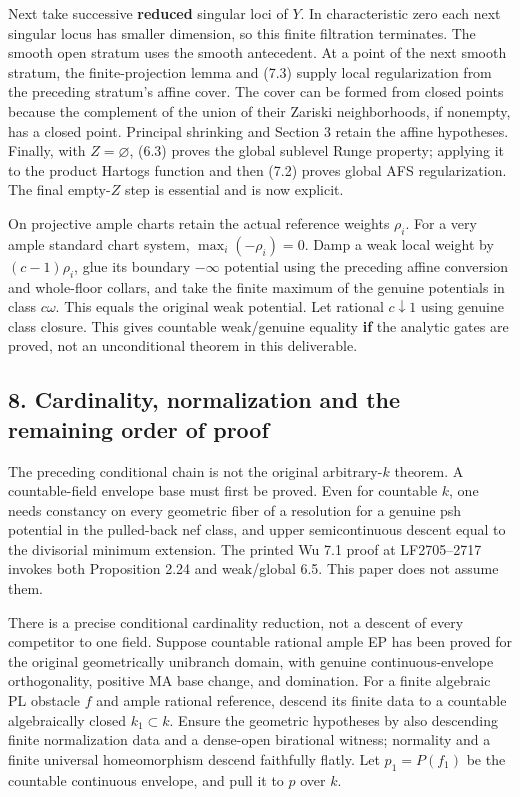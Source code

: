 \documentclass[
  10pt,
]{article}
\begin{document}
Next take successive \textbf{reduced} singular loci of \(Y\). In
characteristic zero each next singular locus has smaller dimension, so
this finite filtration terminates. The smooth open stratum uses the
smooth antecedent. At a point of the next smooth stratum, the
finite-projection lemma and (7.3) supply local regularization from the
preceding stratum's affine cover. The cover can be formed from closed
points because the complement of the union of their Zariski
neighborhoods, if nonempty, has a closed point. Principal shrinking and
Section 3 retain the affine hypotheses. Finally, with \(Z=\varnothing\),
(6.3) proves the global sublevel Runge property; applying it to the
product Hartogs function and then (7.2) proves global AFS
regularization. The final empty-\(Z\) step is essential and is now
explicit.

On projective ample charts retain the actual reference weights
\(\rho_i\). For a very ample standard chart system,
\(\max_i(-\rho_i)=0\). Damp a weak local weight by \((c-1)\rho_i\), glue
its boundary \(-\infty\) potential using the preceding affine conversion
and whole-floor collars, and take the finite maximum of the genuine
potentials in class \(c\omega\). This equals the original weak
potential. Let rational \(c\downarrow1\) using genuine class closure.
This gives countable weak/genuine equality \textbf{if} the analytic
gates are proved, not an unconditional theorem in this deliverable.

\subsection{8. Cardinality, normalization and the remaining order of
proof}\label{cardinality-normalization-and-the-remaining-order-of-proof}

The preceding conditional chain is not the original arbitrary-\(k\)
theorem. A countable-field envelope base must first be proved. Even for
countable \(k\), one needs constancy on every geometric fiber of a
resolution for a genuine psh potential in the pulled-back nef class, and
upper semicontinuous descent equal to the divisorial minimum extension.
The printed Wu 7.1 proof at LF2705--2717 invokes both Proposition 2.24
and weak/global 6.5. This paper does not assume them.

There is a precise conditional cardinality reduction, not a descent of
every competitor to one field. Suppose countable rational ample EP has
been proved for the original geometrically unibranch domain, with
genuine continuous-envelope orthogonality, positive MA base change, and
domination. For a finite algebraic PL obstacle \(f\) and ample rational
reference, descend its finite data to a countable algebraically closed
\(k_1\subset k\). Ensure the geometric hypotheses by also descending
finite normalization data and a dense-open birational witness; normality
and a finite universal homeomorphism descend faithfully flatly. Let
\(p_1=P(f_1)\) be the countable continuous envelope, and pull it to
\(p\) over \(k\).
\end{document}
